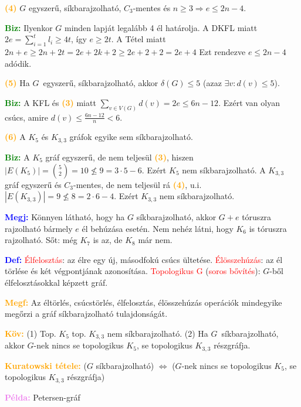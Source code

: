 \documentclass[../../szobeli.tex]{subfiles}
\begin{document}
\begin{itemize}
        \textcolor{orange}{\textbf{(4)}} $G$ egyszerű, síkbarajzolható, $C_3$-mentes és $n \geq 3 \Rightarrow e \leq 2n - 4$. 

        \textcolor{green}{\textbf{Biz:}} Ilyenkor $G$ minden lapját legalább 4 él határolja. A DKFL miatt $2e = \sum_{i=1}^{t}l_i \geq 4t$, így $e \geq 2t$. A Tétel miatt $2n + e \geq 2n + 2t = 2e + 2k + 2 \geq 2e + 2 + 2 = 2e + 4$ Ezt rendezve $e \leq 2n - 4$ adódik. 

        \textcolor{orange}{\textbf{(5)}} Ha $G$ egyszerű, síkbarajzolható, akkor $\delta(G) \leq 5$ (azaz $\exists v : d(v) \leq 5$).

        \textcolor{green}{\textbf{Biz:}} A KFL és \textcolor{orange}{\textbf{(3)}} miatt $\sum_{v\in V(G)}d(v) = 2e \leq 6n - 12$. Ezért van olyan csúcs, amire $d(v) \leq \frac{6n-12}{n} < 6$. 

        \textcolor{orange}{\textbf{(6)}} A $K_5$ és $K_{3,3}$ gráfok egyike sem síkbarajzolható.

        \textcolor{green}{\textbf{Biz:}} A $K_5$ gráf egyszerű, de nem teljesül \textcolor{orange}{\textbf{(3)}}, hiszen $|E(K_5)| = \binom{5}{2} = 10 \nleq 9 = 3 \cdot 5 - 6$. Ezért $K_5$ nem síkbarajzolható. A $K_{3,3}$ gráf egyszerű és $C_3$-mentes, de nem teljesül rá \textcolor{orange}{\textbf{(4)}}, u.i. $|E(K_{3,3})| = 9 \nleq 8 = 2 \cdot 6 - 4$. Ezért $K_{3,3}$ nem síkbarajzolható. 

        \textcolor{blue}{\textbf{Megj:}} Könnyen látható, hogy ha $G$ síkbarajzolható, akkor $G + e$ tóruszra rajzolható bármely $e$ él behúzása esetén. Nem nehéz látni, hogy $K_6$ is tóruszra rajzolható. Sőt: még $K_7$ is az, de $K_8$ már nem. 

        \textcolor{blue}{\textbf{Def:}} \textcolor{red}{Élfelosztás}: az élre egy új, másodfokú csúcs ültetése. \textcolor{red}{Élösszehúzás}: az él törlése és két végpontjának azonosítása. \textcolor{red}{Topologikus G} (\textcolor{red}{soros bővítés}): $G$-ből élfelosztásokkal képzett gráf. 

        \textcolor{orange}{\textbf{Megf:}} Az éltörlés, csúcstörlés, élfelosztás, élösszehúzás operációk mindegyike megőrzi a gráf síkbarajzolható tulajdonságát. 

        \textcolor{orange}{\textbf{Köv:}} (1) Top. $K_5$ top. $K_{3,3}$ nem síkbarajzolható. (2) Ha $G$ síkbarajzolható, akkor $G$-nek nincs se topologikus $K_5$, se topologikus $K_{3,3}$ részgráfja.

        \textcolor{orange}{\textbf{Kuratowski tétele:}} ($G$ síkbarajzolható) $\Longleftrightarrow$ ($G$-nek nincs se topologikus $K_5$, se topologikus $K_{3,3}$ részgráfja) 
        
        \textcolor{violet}{\textbf{Példa:}} Petersen-gráf

    \end{itemize}
\end{document}

